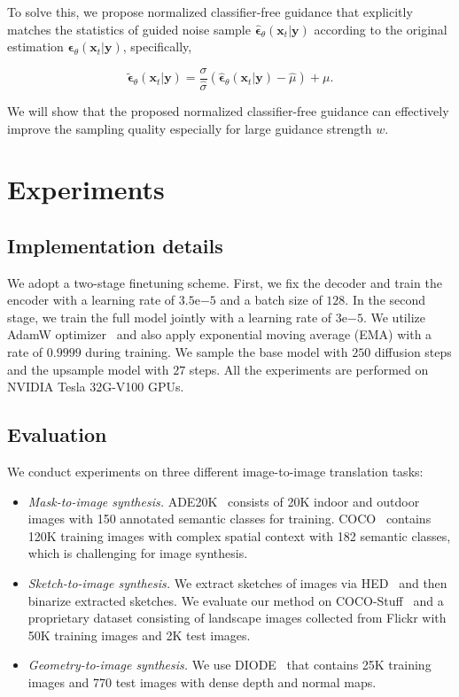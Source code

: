 To solve this, we propose normalized classifier-free guidance that explicitly matches the statistics of guided noise sample $\hat{\bm{\epsilon}}_{\theta}\left(\bm{x}_{t} | \bm{y} \right)$
according to the original estimation $\bm{\epsilon}_{\theta}\left(\bm{x}_{t} | \bm{y} \right)$, specifically,

\begin{equation}
    \tilde{\bm{\epsilon}}_\theta(\bm{x}_t|\bm{y}) = {\frac{\sigma}{\hat{\sigma}}} (\hat{\bm{\epsilon}}_\theta(\bm{x}_t|\bm{y}) - \hat{\mu} ) + \mu.
\end{equation}

We will show that the proposed normalized classifier-free guidance can effectively improve the sampling quality especially for large guidance strength $w$.

\section{Experiments}

\subsection{Implementation details}

We adopt a two-stage finetuning scheme. First, we fix the decoder and train the encoder with a learning rate of $3.5\mathrm{e}{-5}$ and a batch size of $128$. In the second stage, we train the full model jointly with a learning rate of $3\mathrm{e}{-5}$. We utilize AdamW optimizer~\cite{adamw} and also apply exponential moving average (EMA) with a rate of $0.9999$ during training. We sample the base model with $250$ diffusion steps and the upsample model with $27$ steps. All the experiments are performed on NVIDIA Tesla 32G-V100 GPUs. 

\subsection{Evaluation}

We conduct experiments on three different image-to-image translation tasks:

\begin{itemize}[leftmargin=*]
    \itemsep=0.4mm
    \item \emph{Mask-to-image synthesis.}   ADE20K~\cite{zhou2017scene} consists of 20K indoor and outdoor images  with 150 annotated semantic classes for training.  COCO~\cite{caesar2018coco} contains 120K training images with complex spatial context with 182 semantic classes, which is challenging for image synthesis.
    \item \emph{Sketch-to-image synthesis.} We extract sketches of images via HED~\cite{xie2015holistically} and then binarize extracted sketches. We evaluate our method on COCO-Stuff~\cite{caesar2018coco} and a proprietary dataset consisting of landscape images collected from Flickr with 50K training images and 2K test images.
    \item \emph{Geometry-to-image synthesis.} We use DIODE~\cite{vasiljevic2019diode} that contains 25K training images and 770 test images with dense depth and normal maps.  
\end{itemize}


